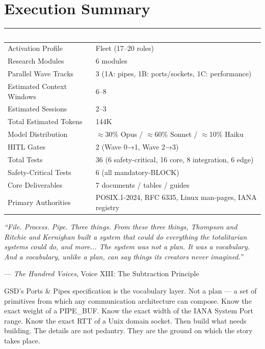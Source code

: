 \documentclass[11pt,letterpaper]{article}
\newcommand{\tableheader}[1]{\textbf{\sffamily\textcolor{white}{#1}}}
\begin{document}
\section{Execution Summary}

\begin{center}
\begin{tabularx}{\textwidth}{L{5cm}X}
\toprule
{}
\tableheader{Metric} & \tableheader{Value} \\
\midrule
Activation Profile & Fleet (17--20 roles) \\
Research Modules & 6 modules \\
Parallel Wave Tracks & 3 (1A: pipes, 1B: ports/sockets, 1C: performance) \\
Estimated Context Windows & 6--8 \\
Estimated Sessions & 2--3 \\
Total Estimated Tokens & 144K \\
Model Distribution & $\approx$30\% Opus / $\approx$60\% Sonnet / $\approx$10\% Haiku \\
HITL Gates & 2 (Wave 0→1, Wave 2→3) \\
Total Tests & 36 (6 safety-critical, 16 core, 8 integration, 6 edge) \\
Safety-Critical Tests & 6 (all mandatory-BLOCK) \\
Core Deliverables & 7 documents / tables / guides \\
Primary Authorities & POSIX.1-2024, RFC 6335, Linux man-pages, IANA registry \\
\bottomrule
\end{tabularx}
\end{center}

\vspace{1em}
\begin{quotebox}
\textit{``File. Process. Pipe. Three things. From these three things, Thompson and Ritchie and Kernighan built a system that could do everything the totalitarian systems could do, and more... The system was not a plan. It was a vocabulary. And a vocabulary, unlike a plan, can say things its creators never imagined.''}

\medskip
\hfill --- \textit{The Hundred Voices}, Voice XIII: The Subtraction Principle

\medskip
\noindent GSD's Ports \& Pipes specification is the vocabulary layer. Not a plan --- a set of primitives from which any communication architecture can compose. Know the exact weight of a PIPE\_BUF. Know the exact width of the IANA System Port range. Know the exact RTT of a Unix domain socket. Then build what needs building. The details are not pedantry. They are the ground on which the story takes place.
\end{quotebox}
\end{document}
